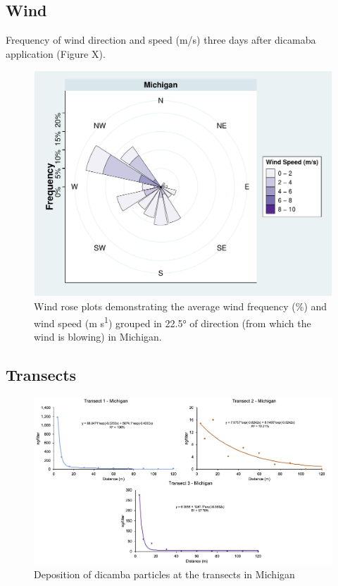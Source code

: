 \documentclass[]{article}
\begin{document}
\pagebreak
\newpage

\subsection{Wind}\label{wind-2}

Frequency of wind direction and speed (m/s) three days after dicamaba
application (Figure X).

\begin{figure}
\centering
\includegraphics{Report_Dicamba_study_files/figure-latex/unnamed-chunk-43-1.pdf}
\caption{Wind rose plots demonstrating the average wind frequency (\%)
and wind speed (m s\textsuperscript{1}) grouped in 22.5° of direction
(from which the wind is blowing) in Michigan.}
\end{figure}

\pagebreak
\newpage

\subsection{Transects}\label{transects-2}

\begin{figure}[h]

{\centering \includegraphics[width=1\linewidth]{MItransect} 

}

\caption{Deposition of dicamba particles at the transects in Michigan}\label{fig:unnamed-chunk-44}
\end{figure}
\end{document}
